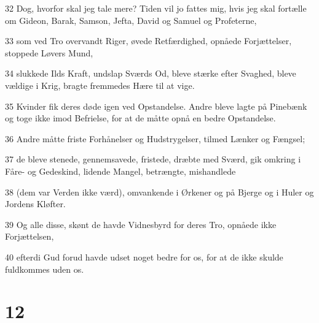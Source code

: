 \par 32 Dog, hvorfor skal jeg tale mere? Tiden vil jo fattes mig, hvis jeg skal fortælle om Gideon, Barak, Samson, Jefta, David og Samuel og Profeterne,
\par 33 som ved Tro overvandt Riger, øvede Retfærdighed, opnåede Forjættelser, stoppede Løvers Mund,
\par 34 slukkede Ilds Kraft, undslap Sværds Od, bleve stærke efter Svaghed, bleve vældige i Krig, bragte fremmedes Hære til at vige.
\par 35 Kvinder fik deres døde igen ved Opstandelse. Andre bleve lagte på Pinebænk og toge ikke imod Befrielse, for at de måtte opnå en bedre Opstandelse.
\par 36 Andre måtte friste Forhånelser og Hudstrygelser, tilmed Lænker og Fængsel;
\par 37 de bleve stenede, gennemsavede, fristede, dræbte med Sværd, gik omkring i Fåre- og Gedeskind, lidende Mangel, betrængte, mishandlede
\par 38 (dem var Verden ikke værd), omvankende i Ørkener og på Bjerge og i Huler og Jordens Kløfter.
\par 39 Og alle disse, skønt de havde Vidnesbyrd for deres Tro, opnåede ikke Forjættelsen,
\par 40 efterdi Gud forud havde udset noget bedre for os, for at de ikke skulde fuldkommes uden os.

\chapter{12}

